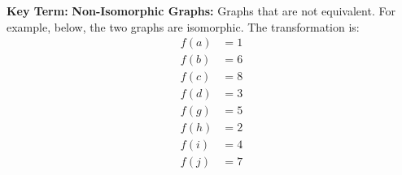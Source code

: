 \documentclass[11pt]{scrartcl}
\begin{document}
\begin{tcolorbox}[colback=vocabcolor!5!white,colframe=vocabcolor!75!black]
  \color{vocabcolor} \textbf{Key Term:} \color{black}
      \textbf{Non-Isomorphic Graphs:} Graphs that are not equivalent. For example, below, the two graphs are isomorphic. The transformation is: 
\begin{align*}
f(a) &= 1 \\
f(b) &= 6 \\
f(c) &= 8 \\
f(d) &= 3 \\
f(g) &= 5 \\
f(h) &= 2 \\
f(i) &= 4 \\
f(j) &= 7 \\
\end{align*}
\end{tcolorbox}
\end{document}
